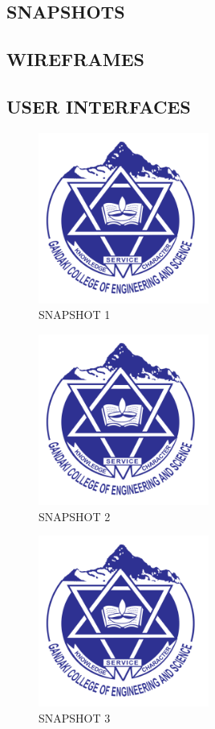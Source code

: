 \begin{center}
	\chapter{SNAPSHOTS}
\end{center}
\section{WIREFRAMES}
\newpage
\section{USER INTERFACES}
	
	
\begin{center}
	\begin{figure}[h!]
  \includegraphics[width=0.5\textwidth]{gces.png}
  \caption{SNAPSHOT 1}
\end{figure}

\begin{figure}[h!]
  \includegraphics[width=0.5\textwidth]{gces.png}
  \caption{SNAPSHOT 2}
\end{figure}

\begin{figure}[h!]
  \includegraphics[width=0.5\textwidth]{gces.png}
  \caption{SNAPSHOT 3}
\end{figure}
\end{center}